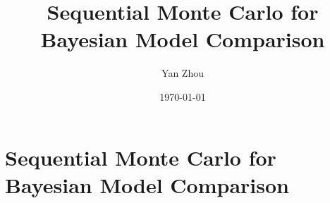 \documentclass[11pt, hyper, bib, fontset=Minion]{marticle}
\title{Sequential Monte Carlo for Bayesian Model Comparison}
\author{Yan Zhou}
\date{\today}
\begin{document}
\maketitle

\else %

\chapter{Sequential Monte Carlo for Bayesian Model Comparison}
\label{cha:Sequential Monte Carlo for Bayesian Model Comparison}

\fi %


\ifx\inthesis\undefined
\printbibliography
\end{document}
